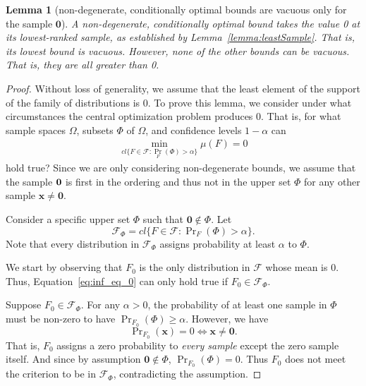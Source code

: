 \documentclass{article}
\newtheorem{lemma}[theorem]{Lemma}
\theoremstyle{definition}
\theoremstyle{remark}
\newcounter{assumption}%
\def\x{\mathbf{x}}
\begin{document}
\begin{lemma}[non-degenerate, conditionally optimal bounds are vacuous only for the sample $\mathbf{0}$]
\label{lemma:non-degenerate}
A non-degenerate, conditionally optimal bound takes the value 0 at its lowest-ranked sample, as established by Lemma~\ref{lemma:leastSample}. That is, its lowest bound is vacuous. However, none of the other bounds can be vacuous. That is, they are all greater than 0.
\end{lemma}
\begin{proof}
Without loss of generality, we assume that the least element of the support of the family of distributions is 0. To prove this lemma, we consider under what circumstances the central optimization problem produces 0. That is, for what sample spaces $\Omega$, subsets $\Phi$ of $\Omega$, and confidence levels $1-\alpha$  can
\begin{eqnarray}
\label{eq:inf_eq_0}
\underset{cl\{F \in \mathcal{F}: \Pr_F(\Phi) > \alpha\}}{\min} 
\mu(F)=0
\end{eqnarray}
hold true?
Since we are only considering non-degenerate bounds, we assume that the sample $\bf{0}$ is first in the ordering and thus not in the upper set $\Phi$ for any other sample $\x\neq \mathbf{0}$. 

Consider a specific upper set $\Phi$ such that $\mathbf{0}\notin \Phi$. Let
$$\mathcal{F}_\Phi=cl\{F \in \mathcal{F}: \Pr\nolimits_F(\Phi) > \alpha\}.$$
Note that every distribution in $\mathcal{F}_{\Phi}$ assigns probability at least $\alpha$ to $\Phi$. 

We start by observing that $F_0$ is the only distribution in  $\mathcal{F}$ whose mean is $0$.  Thus, Equation~\ref{eq:inf_eq_0} can only hold true if $F_0\in \mathcal{F}_{\Phi}$.

Suppose $F_0\in \mathcal{F}_\Phi.$ For any $\alpha>0$, the probability of at least one sample in $\Phi$ must be non-zero to have $\Pr\nolimits_{F_0}(\Phi)\geq \alpha$. However, we have
$$
\Pr\nolimits_{F_0}(\x) = 0 \iff \x\neq \mathbf{0}.
$$
That is, $F_0$ assigns a zero probability to {\em every sample} except the zero sample itself. And since by assumption $\mathbf{0} \notin \Phi$, $\Pr_{F_0}(\Phi)=0.$
Thus $F_0$ does not meet the criterion to be in $\mathcal{F}_\Phi$, contradicting the assumption.
\end{proof}
\end{document}
